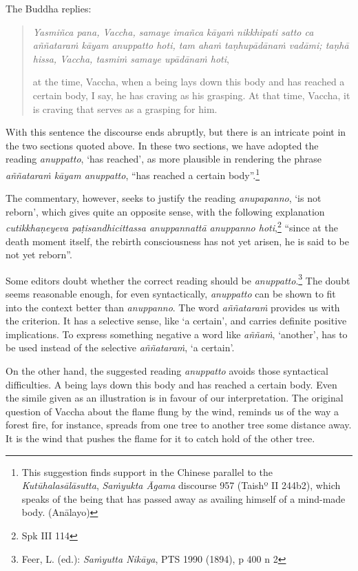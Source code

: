 The Buddha replies:

\begin{quote}
\emph{Yasmiñca pana, Vaccha, samaye imañca kāyaṁ nikkhipati satto ca aññataraṁ kāyam anuppatto hoti, tam ahaṁ taṇhupādānaṁ vadāmi; taṇhā hissa, Vaccha, tasmiṁ samaye upādānaṁ hoti},

at the time, Vaccha, when a being lays down this body and has reached a certain body, I say, he has craving as his grasping. At that time, Vaccha, it is craving that serves as a grasping for him.
\end{quote}

With this sentence the discourse ends abruptly, but there is an intricate point in the two sections quoted above. In these two sections, we have adopted the reading \emph{anuppatto}, `has reached', as more plausible in rendering the phrase \emph{aññataraṁ kāyam anuppatto}, ``has reached a certain body''.\footnote{This suggestion finds support in the Chinese parallel to the \emph{Kutūhalasālāsutta}, \emph{Saṁyukta Āgama} discourse 957 (Taishº II 244b2), which speaks of the being that has passed away as availing himself of a mind-made body. (Anālayo)}

The commentary, however, seeks to justify the reading \emph{anupapanno}, `is not reborn', which gives quite an opposite sense, with the following explanation \emph{cutikkhaṇeyeva paṭisandhicittassa anuppannattā anuppanno hoti},\footnote{Spk III 114} ``since at the death moment itself, the rebirth consciousness has not yet arisen, he is said to be not yet reborn''.

Some editors doubt whether the correct reading should be \emph{anuppatto}.\footnote{Feer, L. (ed.): \emph{Saṁyutta Nikāya}, PTS 1990 (1894), p 400 n 2} The doubt seems reasonable enough, for even syntactically, \emph{anuppatto} can be shown to fit into the context better than \emph{anuppanno}. The word \emph{aññataraṁ} provides us with the criterion. It has a selective sense, like `a certain', and carries definite positive implications. To express something negative a word like \emph{aññaṁ}, `another', has to be used instead of the selective \emph{aññataraṁ}, `a certain'.

On the other hand, the suggested reading \emph{anuppatto} avoids those syntactical difficulties. A being lays down this body and has reached a certain body. Even the simile given as an illustration is in favour of our interpretation. The original question of Vaccha about the flame flung by the wind, reminds us of the way a forest fire, for instance, spreads from one tree to another tree some distance away. It is the wind that pushes the flame for it to catch hold of the other tree.

